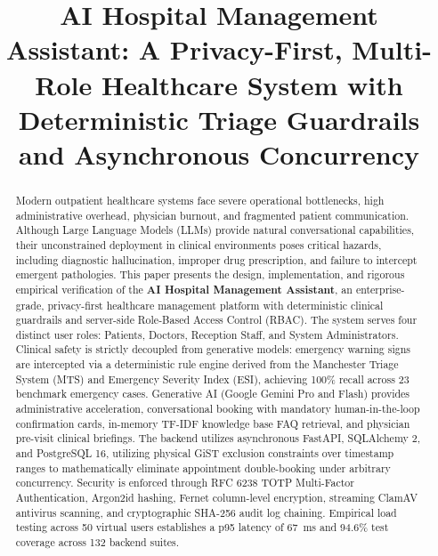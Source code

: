 \documentclass[conference]{IEEEtran}
\begin{document}
\title{AI Hospital Management Assistant: A Privacy-First, Multi-Role Healthcare System with Deterministic Triage Guardrails and Asynchronous Concurrency}

\author{
}

\maketitle

\begin{abstract}
Modern outpatient healthcare systems face severe operational bottlenecks, high administrative overhead, physician burnout, and fragmented patient communication. Although Large Language Models (LLMs) provide natural conversational capabilities, their unconstrained deployment in clinical environments poses critical hazards, including diagnostic hallucination, improper drug prescription, and failure to intercept emergent pathologies. This paper presents the design, implementation, and rigorous empirical verification of the \textbf{AI Hospital Management Assistant}, an enterprise-grade, privacy-first healthcare management platform with deterministic clinical guardrails and server-side Role-Based Access Control (RBAC). The system serves four distinct user roles: Patients, Doctors, Reception Staff, and System Administrators. Clinical safety is strictly decoupled from generative models: emergency warning signs are intercepted via a deterministic rule engine derived from the Manchester Triage System (MTS) and Emergency Severity Index (ESI), achieving 100\% recall across 23 benchmark emergency cases. Generative AI (Google Gemini Pro and Flash) provides administrative acceleration, conversational booking with mandatory human-in-the-loop confirmation cards, in-memory TF-IDF knowledge base FAQ retrieval, and physician pre-visit clinical briefings. The backend utilizes asynchronous FastAPI, SQLAlchemy 2, and PostgreSQL 16, utilizing physical GiST exclusion constraints over timestamp ranges to mathematically eliminate appointment double-booking under arbitrary concurrency. Security is enforced through RFC 6238 TOTP Multi-Factor Authentication, Argon2id hashing, Fernet column-level encryption, streaming ClamAV antivirus scanning, and cryptographic SHA-256 audit log chaining. Empirical load testing across 50 virtual users establishes a p95 latency of 67~ms and 94.6\% test coverage across 132 backend suites.
\end{abstract}
\end{document}
